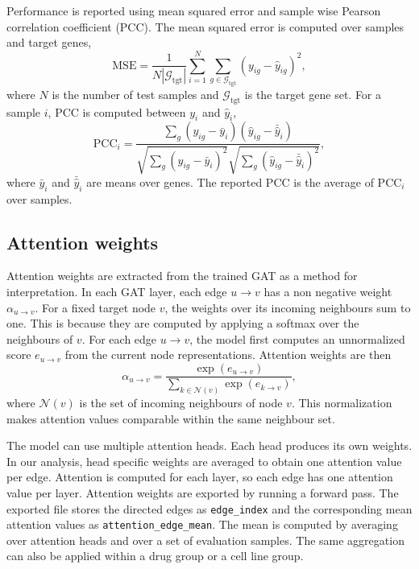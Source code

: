 \noindent Performance is reported using mean squared error and sample wise Pearson correlation coefficient (PCC). The mean squared error is computed over samples and target genes,
\begin{equation}
\mathrm{MSE}=\frac{1}{N|\mathcal{G}_{\mathrm{tgt}}|}\sum_{i=1}^{N}\sum_{g\in\mathcal{G}_{\mathrm{tgt}}}\left(y_{ig}-\hat{y}_{ig}\right)^{2},
\end{equation}
where $N$ is the number of test samples and $\mathcal{G}_{\mathrm{tgt}}$ is the target gene set.
For a sample $i$, PCC is computed between $y_{i}$ and $\hat{y}_{i}$,
\begin{equation}
\mathrm{PCC}_{i}=\frac{\sum_{g}\left(y_{ig}-\bar{y}_{i}\right)\left(\hat{y}_{ig}-\bar{\hat{y}}_{i}\right)}{\sqrt{\sum_{g}\left(y_{ig}-\bar{y}_{i}\right)^{2}}\sqrt{\sum_{g}\left(\hat{y}_{ig}-\bar{\hat{y}}_{i}\right)^{2}}},
\end{equation}
where $\bar{y}_{i}$ and $\bar{\hat{y}}_{i}$ are means over genes. The reported PCC is the average of $\mathrm{PCC}_{i}$ over samples.

\subsection{Attention weights}
Attention weights are extracted from the trained GAT as a method for interpretation. In each GAT layer, each edge $u\rightarrow v$ has a non negative weight $\alpha_{u\rightarrow v}$. For a fixed target node $v$, the weights over its incoming neighbours sum to one. This is because they are computed by applying a softmax over the neighbours of $v$. For each edge $u\rightarrow v$, the model first computes an unnormalized score $e_{u\rightarrow v}$ from the current node representations. Attention weights are then
\begin{equation}
\alpha_{u\rightarrow v}=\frac{\exp\left(e_{u\rightarrow v}\right)}{\sum_{k\in\mathcal{N}(v)}\exp\left(e_{k\rightarrow v}\right)},
\end{equation}
where $\mathcal{N}(v)$ is the set of incoming neighbours of node $v$. This normalization makes attention values comparable within the same neighbour set.

\noindent The model can use multiple attention heads. Each head produces its own weights. In our analysis, head specific weights are averaged to obtain one attention value per edge. Attention is computed for each layer, so each edge has one attention value per layer. Attention weights are exported by running a forward pass. The exported file stores the directed edges as \texttt{edge\_index} and the corresponding mean attention values as \texttt{attention\_edge\_mean}. The mean is computed by averaging over attention heads and over a set of evaluation samples. The same aggregation can also be applied within a drug group or a cell line group.

